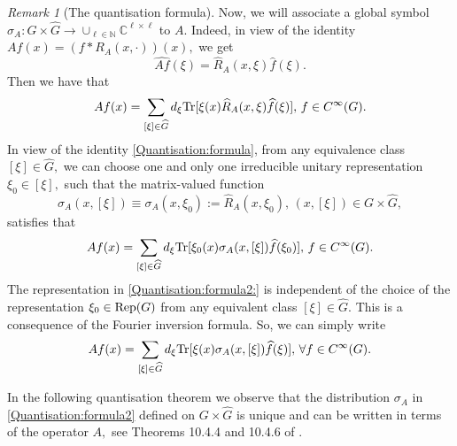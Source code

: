 \documentclass[12pt, reqno]{amsart}
\theoremstyle{definition}
\theoremstyle{remark}
\newtheorem{remark}[theorem]{Remark}
\numberwithin{equation}{section}
\begin{document}
\begin{remark}[The quantisation formula]
 Now, we will associate  a global symbol $\sigma_A:G\times \widehat{G}\rightarrow \cup_{\ell\in \mathbb{N}}\mathbb{C}^{\ell\times \ell}$ to $A.$ Indeed,  in view of the identity $Af(x)=(f\ast R_{A}(x,\cdot))(x),$  we get 
 $$ \widehat{Af}(\xi)= \widehat{R}_{A}(x,\xi)\widehat{f}(\xi). $$ Then we have
 that
 \begin{equation}\label{Quantisation:formula}
     Af(x)=\sum_{[\xi]\in \widehat{G}}d_\xi\textnormal{Tr}[\xi(x)\widehat{R}_{A}(x,\xi)\widehat{f}(\xi)],\,f\in C^\infty(G).
 \end{equation} In view of the identity \eqref{Quantisation:formula}, from any equivalence class $[\xi]\in \widehat{G},$ we can choose one and only one irreducible unitary representation $\xi_0\in [\xi],$ such that the matrix-valued function
 \begin{equation}
    \sigma_{A}(x,[\xi])\equiv \sigma_A(x,\xi_0):=\widehat{R}_{A}(x,\xi_0),\,(x,[\xi])\in G\times\widehat{G},
 \end{equation} satisfies that
\begin{equation}\label{Quantisation:formula2:}
     Af(x)=\sum_{[\xi]\in \widehat{G}}d_\xi\textnormal{Tr}[\xi_0(x)\sigma_{A}(x,[\xi])\widehat{f}(\xi_0)],\,f\in C^\infty(G).
 \end{equation}
 The representation in \eqref{Quantisation:formula2:} is independent of the choice of the representation $\xi_0\in \textnormal{Rep}(G)$ from any equivalent class $[\xi]\in \widehat{G}.$ This is a consequence of the Fourier inversion formula.   
 So, we can simply write
 \begin{equation}\label{Quantisation:formula2}
     Af(x)=\sum_{[\xi]\in \widehat{G}}d_\xi\textnormal{Tr}[\xi(x)\sigma_{A}(x,[\xi])\widehat{f}(\xi)],\,\forall f\in C^\infty(G).
 \end{equation}  
\end{remark}
In the following quantisation theorem we observe that the distribution $\sigma_A$ in \eqref{Quantisation:formula2} defined on $G\times \widehat{G}$ is unique and can be written in terms of the operator $A,$ see Theorems  10.4.4 and 10.4.6 of \cite{Ruz}.
\end{document}
